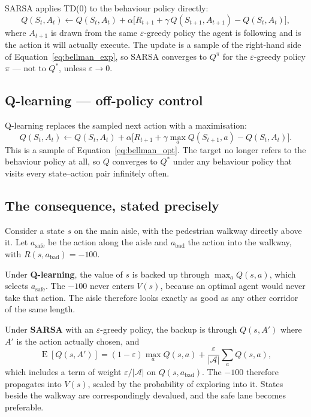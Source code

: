 SARSA applies TD(0) to the behaviour policy directly:
\begin{equation}
Q(S_t,A_t) \leftarrow Q(S_t,A_t) + \alpha\Big[R_{t+1} + \gamma\, Q(S_{t+1},A_{t+1}) - Q(S_t,A_t)\Big],
\label{eq:sarsa}
\end{equation}
where $A_{t+1}$ is drawn from the same $\varepsilon$-greedy policy the agent is following and is
the action it will actually execute. The update is a sample of the right-hand side of
Equation~\ref{eq:bellman_exp}, so SARSA converges to $Q^{\pi}$ for the $\varepsilon$-greedy policy
$\pi$ --- not to $Q^{*}$, unless $\varepsilon \to 0$.

\subsection{Q-learning --- off-policy control}

Q-learning replaces the sampled next action with a maximisation:
\begin{equation}
Q(S_t,A_t) \leftarrow Q(S_t,A_t) + \alpha\Big[R_{t+1} + \gamma \max_{a} Q(S_{t+1},a) - Q(S_t,A_t)\Big].
\label{eq:qlearning}
\end{equation}
This is a sample of Equation~\ref{eq:bellman_opt}. The target no longer refers to the behaviour
policy at all, so $Q$ converges to $Q^{*}$ under any behaviour policy that visits every
state--action pair infinitely often.

\subsection{The consequence, stated precisely}

Consider a state $s$ on the main aisle, with the pedestrian walkway directly above it. Let $a_{\text{safe}}$
be the action along the aisle and $a_{\text{bad}}$ the action into the walkway, with
$R(s, a_{\text{bad}}) = -100$.

Under \textbf{Q-learning}, the value of $s$ is backed up through $\max_a Q(s,a)$, which selects
$a_{\text{safe}}$. The $-100$ never enters $V(s)$, because an optimal agent would never take that
action. The aisle therefore looks exactly as good as any other corridor of the same length.

Under \textbf{SARSA} with an $\varepsilon$-greedy policy, the backup is through
$Q(s, A')$ where $A'$ is the action actually chosen, and
\begin{equation}
\operatorname{E}[Q(s,A')] = (1-\varepsilon)\max_a Q(s,a) + \frac{\varepsilon}{|\mathcal{A}|}\sum_{a} Q(s,a),
\end{equation}
which includes a term of weight $\varepsilon / |\mathcal{A}|$ on $Q(s, a_{\text{bad}})$. The
$-100$ therefore propagates into $V(s)$, scaled by the probability of exploring into it. States
beside the walkway are correspondingly devalued, and the safe lane becomes preferable.

